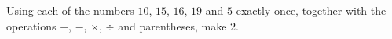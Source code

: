 Using each of the numbers $10$, $15$, $16$, $19$ and $5$ exactly once, together with the operations $+$, $-$, $\times$, $\div$ and parentheses, make $2$.
